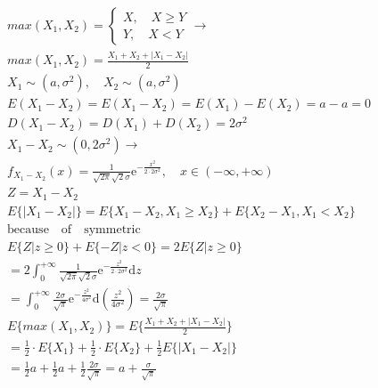 \documentclass{article}
\begin{document}
\begin{align*}
    max(X_{1},X_{2}) = \left\{ 
        \begin{array}{rl}
            X, \quad X \ge Y \\
            Y, \quad X < Y
        \end{array}
    \right. \longrightarrow \\
    max(X_{1},X_{2}) = \frac{X_{1} + X_{2} + |X_{1}-X_{2}|}{2}\\
    X_{1} \sim (a, \sigma^{2}), \quad X_{2} \sim (a, \sigma^{2})\\
    E(X_{1}-X_{2}) = E(X_{1}-X_{2}) = E(X_{1})-E(X_{2}) = a-a=0\\
    D(X_{1}-X_{2}) = D(X_{1}) + D(X_{2}) = 2\sigma^{2} \\
    X_{1}-X_{2} \sim (0,2\sigma^{2}) \longrightarrow \\
    f_{X_{1}-X_{2}}(x) = \frac{1}{\sqrt{2\pi}\sqrt{2}\sigma}\mathrm{e}^{-\frac{x^2}{2 \cdot 2\sigma^{2}}}, \quad x \in (-\infty,+\infty)\\
    Z = X_{1}-X_{2}\\
    E\{|X_{1}-X_{2}|\} = E\{X_{1}-X_{2},X_{1} \ge X_{2}\} +E\{X_{2}-X_{1}, X_{1} < X_{2}\}\\
    \mathrm{because \quad of \quad symmetric}\\
    E\{Z| z \ge 0\}  + E\{-Z | z < 0\} = 2 E\{Z| z \ge 0\} \\ 
    = 2 \int_{0}^{+\infty} \frac{1}{\sqrt{2\pi}\sqrt{2}\sigma}\mathrm{e}^{-\frac{z^2}{2 \cdot 2\sigma^{2}}} \mathrm{d}z \\
    = \int_{0}^{+\infty} \frac{2\sigma}{\sqrt{\pi}} \mathrm{e}^{-\frac{z^2}{4\sigma^{2}}} \mathrm{d}\left(\frac{z^2}{4\sigma^{2}}\right) = \frac{2\sigma}{\sqrt{\pi}}\\
    E\{max(X_{1},X_{2})\} = E\{\frac{X_{1} + X_{2} + |X_{1}-X_{2}|}{2}\} \\ 
    = \frac{1}{2} \cdot E\{X_{1}\} + \frac{1}{2} \cdot E\{X_{2}\} + \frac{1}{2} E\{|X_{1} - X_{2}|\} \\
    = \frac{1}{2} a + \frac{1}{2} a + \frac{1}{2} \frac{2\sigma}{\sqrt{\pi}} = a+\frac{\sigma}{\sqrt{\pi}}\\
\end{align*}
\end{document}
